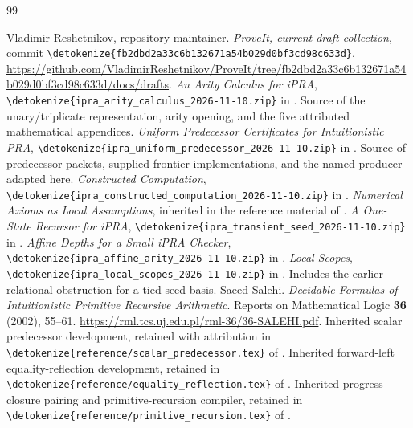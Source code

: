 \documentclass[11pt,letterpaper]{article}
\theoremstyle{definition}\newtheorem{definition}[theorem]{Definition}
\theoremstyle{remark}\newtheorem{remark}[theorem]{Remark}
\newcommand{\file}[1]{\expandafter\nolinkurl\expandafter{\detokenize{#1}}}
\begin{document}
\clearpage
\begin{thebibliography}{99}
\raggedright
{}
Vladimir Reshetnikov, repository maintainer.
\emph{ProveIt, current draft collection}, commit
\file{fb2dbd2a33c6b132671a54b029d0bf3cd98c633d}.
\url{https://github.com/VladimirReshetnikov/ProveIt/tree/fb2dbd2a33c6b132671a54b029d0bf3cd98c633d/docs/drafts}.
\emph{An Arity Calculus for iPRA},
\file{ipra_arity_calculus_2026-11-10.zip} in \cite{corpus}.
Source of the unary/triplicate representation, arity opening, and the
five attributed mathematical appendices.
\emph{Uniform Predecessor Certificates for Intuitionistic PRA},
\file{ipra_uniform_predecessor_2026-11-10.zip} in \cite{corpus}.
Source of predecessor packets, supplied frontier implementations, and
the named producer adapted here.
\emph{Constructed Computation},
\file{ipra_constructed_computation_2026-11-10.zip} in \cite{corpus}.
\emph{Numerical Axioms as Local Assumptions}, inherited in the reference
material of \cite{arity,constructed}.
\emph{A One-State Recursor for iPRA},
\file{ipra_transient_seed_2026-11-10.zip} in \cite{corpus}.
\emph{Affine Depths for a Small iPRA Checker},
\file{ipra_affine_arity_2026-11-10.zip} in \cite{corpus}.
\emph{Local Scopes}, \file{ipra_local_scopes_2026-11-10.zip} in
\cite{corpus}. Includes the earlier relational obstruction for a
tied-seed basis.
Saeed Salehi. \emph{Decidable Formulas of Intuitionistic Primitive
Recursive Arithmetic}. Reports on Mathematical Logic \textbf{36}
(2002), 55--61.
\url{https://rml.tcs.uj.edu.pl/rml-36/36-SALEHI.pdf}.
Inherited scalar predecessor development, retained with attribution in
\file{reference/scalar_predecessor.tex} of \cite{arity}.
Inherited forward-left equality-reflection development, retained in
\file{reference/equality_reflection.tex} of \cite{arity}.
Inherited progress-closure pairing and primitive-recursion compiler,
retained in \file{reference/primitive_recursion.tex} of \cite{arity}.
\end{thebibliography}
\end{document}
